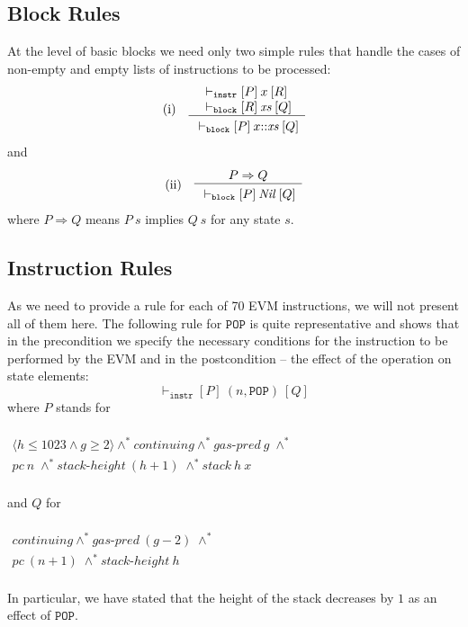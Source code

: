 \documentclass[sigplan,10pt,review]{acmart}\settopmatter{printfolios=true,printccs=false,printacmref=false}
\newcommand{\subpred}{\Rightarrow}
\newcommand{\sconj}{\wedge^*}
\newcommand{\ttrip}[5]{\mathit{#1} \vdash_{\mathrm{#2}}[#3]\:#4\:[#5]}
\newcommand{\cont}{\mathit{continuing}}
\newcommand{\pc}{\mathit{pc}}
\newcommand{\gaspred}{\mathit{gas\mbox{-}pred}}
\newcommand{\stackh}{\mathit{stack\mbox{-}height}}
\newcommand{\stack}{\mathit{stack}}
\newcommand{\instr}[1]{\mathtt{#1}}
\newcommand{\pure}[1]{\langle#1\rangle}
\newcommand{\RuleC}[2]{\begin{array}{c}#1\\\hline\noalign{\smallskip}#2\end{array}}
\begin{document}
\subsection{Block Rules}
At the level of basic blocks we need only two simple rules
that handle the cases of non-empty and empty lists of instructions
to be processed:
\[
\begin{array}{l l}
\mbox{(i)} & \RuleC{\begin{array}{l}\ttrip{}{\mathtt{instr}}{P}{x}{R} \\
                    \ttrip{}{\mathtt{block}}{R}{\mathit{xs}}{Q}
                    \end{array}}
                   {\ttrip{}{\mathtt{block}}{P}{x\mbox{::}\mathit{xs}}{Q}}
\end{array}
\]
and
\[
\begin{array}{l l}
\mbox{(ii)} & \RuleC{P \subpred Q} 
{\ttrip{}{\mathtt{block}}{P}{\mathit{Nil}}{Q}}
\end{array}
\]
where $P \subpred Q$ means $P\:s$ implies $Q\:s$ for any state $s$.
%
\subsection{Instruction Rules}
As we need to provide a rule for each of 70 EVM instructions, we will not
present all of them here. The following rule for $\instr{POP}$ is quite representative
and shows that in the precondition we specify the necessary conditions for 
the instruction to be performed by the EVM and in the postcondition -- 
the effect of the operation on state elements:
\[
\ttrip{}{\mathtt{instr}}{P}{(n, \instr{POP})}{Q}
\]
where $P$ stands for 
\\
\\$
\begin{array}{l}
\pure{h \le 1023 \wedge g \geq 2} \sconj \cont \sconj \gaspred\:g \; \sconj \\
\pc\:n \; \sconj \stackh\:(h + 1) \; \sconj \stack\:h\:x  
\end{array}
$\\ 
\\
and $Q$ for\\
\\$
\begin{array}{l}
\cont \sconj \gaspred\:(g - 2) \; \sconj \\
\pc\:(n+1) \; \sconj \stackh\:h 
\end{array}
$\\
\\
In particular, we have stated that the height of the stack decreases by $1$ as
an effect of $\instr{POP}$.
\end{document}
